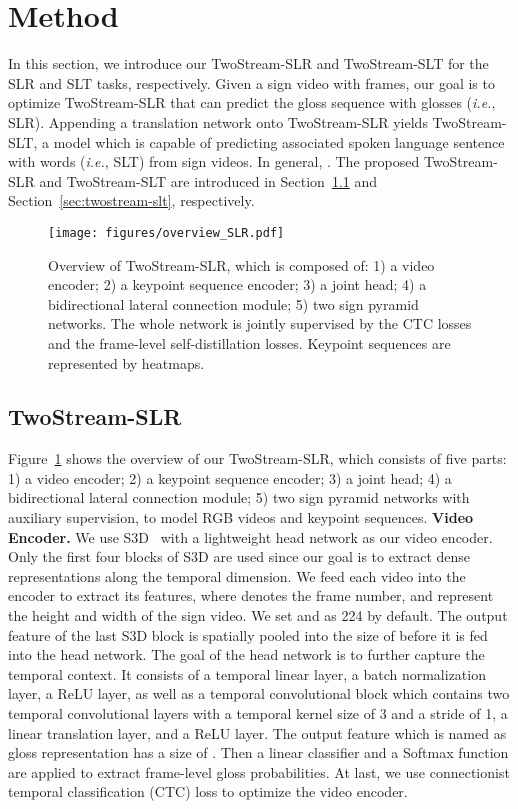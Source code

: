 \documentclass{article}
\def\ie{\emph{i.e.}} \def\Ie{\emph{I.e.}}
\begin{document}
 \section{Method}
In this section, we introduce our TwoStream-SLR and TwoStream-SLT for the SLR and SLT tasks, respectively. Given a sign video  with  frames, our goal is to optimize TwoStream-SLR that can predict the gloss sequence  with  glosses (\ie, SLR). Appending a translation network onto TwoStream-SLR yields TwoStream-SLT, a model which is capable of predicting associated spoken language sentence  with  words (\ie, SLT) from sign videos. In general, . The proposed TwoStream-SLR and TwoStream-SLT are introduced in Section~\ref{sec:twostream-slr} and Section~\ref{sec:twostream-slt}, respectively.



\begin{figure}[t]
\centering
\texttt{[image: figures/overview\_SLR.pdf]}
\caption{Overview of TwoStream-SLR, which is composed of: 1) a video encoder; 2) a keypoint sequence encoder; 3) a joint head; 4) a bidirectional lateral connection module; 5) two sign pyramid networks. The whole network is jointly supervised by the CTC losses and the frame-level self-distillation losses. Keypoint sequences are represented by heatmaps.}
\label{fig:overview_SLR}
\end{figure}

\subsection{TwoStream-SLR}
\label{sec:twostream-slr}
Figure~\ref{fig:overview_SLR} shows the overview of our TwoStream-SLR, which consists of five parts: 1) a video encoder; 2) a keypoint sequence encoder; 3) a joint head; 4) a bidirectional lateral connection module; 5) two sign pyramid networks with auxiliary supervision, to model RGB videos and keypoint sequences. 
\textbf{Video Encoder.} We use S3D~\cite{xie2018rethinking} with a lightweight head network as our video encoder. Only the first four blocks of S3D are used since our goal is to extract dense representations along the temporal dimension. We feed each  video into the encoder to extract its features, where  denotes the frame number,  and  represent the height and width of the sign video. We set  and  as 224 by default. The output feature of the last S3D block is spatially pooled into the size of  before it is fed into the head network. The goal of the head network is to further capture the temporal context. It consists of a temporal linear layer, a batch normalization layer, a ReLU layer, as well as a temporal convolutional block which contains two temporal convolutional layers with a temporal kernel size of 3 and a stride of 1, a linear translation layer, and a ReLU layer. The output feature which is named as gloss representation has a size of . Then a linear classifier and a Softmax function are applied to extract frame-level gloss probabilities. At last, we use connectionist temporal classification (CTC) loss  to optimize the video encoder.
\end{document}
